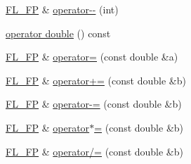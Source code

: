 \begin{DoxyCompactItemize}
\hyperlink{class_f_l___f_p}{F\+L\+\_\+\+FP} \& \hyperlink{class_f_l___f_p_a1a15cf670b1b9a8e66d6ba910bcb8e62}{operator-\/-\/} (int)
\item 
\hyperlink{class_f_l___f_p_af0526310d4b3754485f712b5dfb96b32}{operator double} () const
\item 
\hyperlink{class_f_l___f_p}{F\+L\+\_\+\+FP} \& \hyperlink{class_f_l___f_p_a676730a35c5b8e87c672336a34fa684d}{operator=} (const double \&a)
\item 
\hyperlink{class_f_l___f_p}{F\+L\+\_\+\+FP} \& \hyperlink{class_f_l___f_p_a858ea714be8344937bf2a1b78ff64b55}{operator+=} (const double \&b)
\item 
\hyperlink{class_f_l___f_p}{F\+L\+\_\+\+FP} \& \hyperlink{class_f_l___f_p_a43876e6b2d9ce28d6c230e75dfbe8cd5}{operator-\/=} (const double \&b)
\item 
\hyperlink{class_f_l___f_p}{F\+L\+\_\+\+FP} \& \hyperlink{class_f_l___f_p_aa5786b1ca47a70a1c61c0da74bfc5036}{operator$\ast$=} (const double \&b)
\item 
\hyperlink{class_f_l___f_p}{F\+L\+\_\+\+FP} \& \hyperlink{class_f_l___f_p_ab49fcbb06bdc25f29cc238f4c21c722d}{operator/=} (const double \&b)
\end{DoxyCompactItemize}
